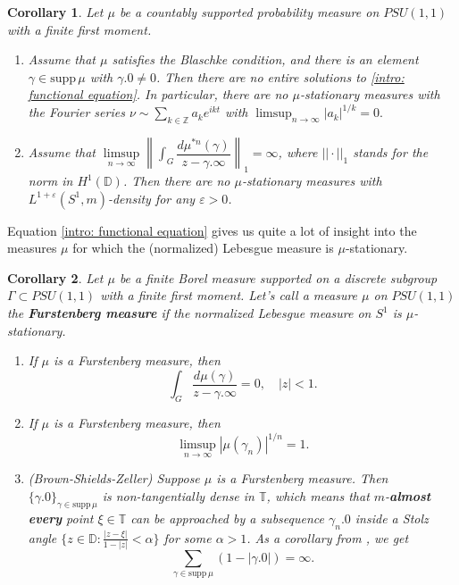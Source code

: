 \documentclass[11pt]{article}
\newtheorem{corollary}{Corollary}[section]
\begin{document}
\begin{corollary}
	\label{C:main corollary}
	Let $\mu$ be a countably supported probability measure on $PSU(1,1)$ with a finite first moment.
	\begin{enumerate}
		\item Assume that $\mu$ satisfies the Blaschke condition, and there is an element $\gamma \in \text{supp} \, \mu$ with $\gamma.0 \ne 0$. Then there are no entire solutions to \eqref{intro: functional equation}. In particular, there are no $\mu$-stationary measures with the Fourier series $\nu \sim \sum_{k \in \mathbb{Z}} a_k e^{i k t}$ with $\limsup_{n \rightarrow \infty} |a_k|^{1/k} = 0.$
		\item Assume that $\limsup\limits_{n \rightarrow \infty} \left\| \int_G \dfrac{d \mu^{*n}(\gamma)}{z - \gamma.\infty} \right\|_1 = \infty$, where $||\cdot||_1$ stands for the norm in $H^1(\mathbb{D})$. Then there are no $\mu$-stationary measures with $L^{1+\varepsilon}(S^1, m)$-density for any $\varepsilon > 0$.
	\end{enumerate}
\end{corollary}

Equation \eqref{intro: functional equation} gives us quite a lot of insight into the measures $\mu$ for which the (normalized) Lebesgue measure is $\mu$-stationary.

\begin{corollary}
	\label{intro: Lebesgue is stationary}
	Let $\mu$ be a finite Borel measure supported on a discrete subgroup $\Gamma \subset PSU(1,1)$ with a finite first moment. Let's call a measure $\mu$ on $PSU(1,1)$  the \textbf{Furstenberg measure} if the normalized Lebesgue measure on $S^1$ is $\mu$-stationary.
	\begin{enumerate}
		\item If $\mu$ is a Furstenberg measure, then
		\begin{equation}
			\int_G \frac{d \mu(\gamma)}{z - \gamma.\infty} = 0, \quad |z| < 1.
		\end{equation}
		\item If $\mu$ is a Furstenberg measure, then
		\[
		\limsup_{n \rightarrow \infty} |\mu(\gamma_n)|^{1/n} = 1.
		\]
		\item (Brown-Shields-Zeller) Suppose $\mu$ is a Furstenberg measure. Then $\{\gamma.0\}_{\gamma \in \text{supp} \, \mu}$ is non-tangentially dense in $\mathbb{T}$, which means that $m$-\textbf{almost every} point $\xi \in \mathbb{T}$ can be approached by a subsequence $\gamma_n.0$ inside a Stolz angle $\{ z \in \mathbb{D} : \frac{|z - \xi|}{1 - |z|} < \alpha \}$ for some $\alpha > 1$. As a corollary from \cite[Remark 2]{brownsums}, we get
		\[
		\sum_{\gamma \in \text{supp}\, \mu} (1 - |\gamma.0|) = \infty.
		\]
	\end{enumerate}
\end{corollary}
\end{document}
